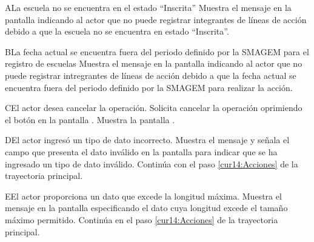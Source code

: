 
 \begin{UCtrayectoriaA}{A}{La escuela no se encuentra en el estado ``Inscrita''}
    \UCpaso[\UCsist] Muestra el mensaje  en la pantalla  indicando al actor que no puede registrar integrantes de líneas de acción debido a que la escuela no se encuentra en estado ``Inscrita''.
 \end{UCtrayectoriaA}

 \begin{UCtrayectoriaA}{B}{La fecha actual se encuentra fuera del periodo definido por la SMAGEM para el registro de escuelas}
    \UCpaso[\UCsist] Muestra el mensaje  en la pantalla  indicando al actor que no puede registrar intregrantes de líneas de acción debido a que la fecha actual se encuentra fuera del periodo definido por la SMAGEM para realizar la acción.
 \end{UCtrayectoriaA}

 \begin{UCtrayectoriaA}{C}{El actor desea cancelar la operación.}
    \UCpaso[\UCactor] Solicita cancelar la operación oprimiendo el botón  en la pantalla .
    \UCpaso[\UCsist] Muestra la pantalla .
 \end{UCtrayectoriaA}

   \begin{UCtrayectoriaA}{D}{El actor ingresó un tipo de dato incorrecto.}
    \UCpaso[\UCsist] Muestra el mensaje  y señala el campo que presenta el dato inválido en la 
    pantalla  para indicar que se ha ingresado un tipo de dato inválido.
    \UCpaso[] Continúa con el paso \ref{cur14:Acciones} de la trayectoria principal.
 \end{UCtrayectoriaA}

 \begin{UCtrayectoriaA}{E}{El actor proporciona un dato que excede la longitud máxima.}
    \UCpaso[\UCsist] Muestra el mensaje  en la pantalla  especificando el dato cuya longitud excede el tamaño máximo permitido.
   \UCpaso[] Continúa en el paso \ref{cur14:Acciones} de la trayectoria principal.
 \end{UCtrayectoriaA}

